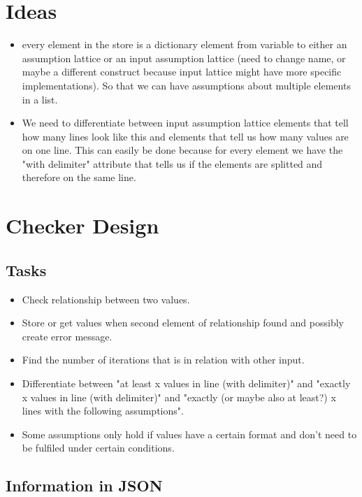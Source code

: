 \documentclass[11pt]{article}
\begin{document}
\section{Ideas}

\begin{itemize}
  \item every element in the store is a dictionary element from variable to either an assumption lattice or an input assumption lattice (need to change name, or maybe a different construct because input lattice might have more specific implementations). So that we can have assumptions about multiple elements in a list. 
  \item We need to differentiate between input assumption lattice elements that tell how many lines look like this and elements that tell us how many values are on one line. This can easily be done because for every element we have the "with delimiter" attribute that tells us if the elements are splitted and therefore on the same line.
\end{itemize}


\section{Checker Design}

\subsection{Tasks}

\begin{itemize}
  \item Check relationship between two values.
  \item Store or get values when second element of relationship found and possibly create error message.
  \item Find the number of iterations that is in relation with other input.
  \item Differentiate between "at least x values in line (with delimiter)" and "exactly x values in line (with delimiter)" and "exactly (or maybe also at least?) x lines with the following assumptions".
  \item Some assumptions only hold if values have a certain format and don't need to be fulfiled under certain conditions.
\end{itemize}

\subsection{Information in JSON}
\end{document}
